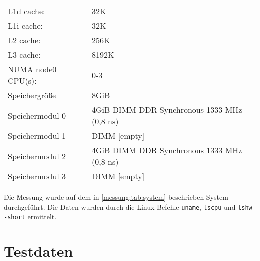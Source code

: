 \begin{table}
{\begin{tabular}{ll}
L1d cache:           & 32K \\
L1i cache:           & 32K \\
L2 cache:            & 256K \\
L3 cache:            & 8192K \\
NUMA node0 CPU(s):   & 0-3 \\
\midrule
Speichergröße        & 8GiB \\
Speichermodul 0      & 4GiB DIMM DDR Synchronous 1333 MHz (0,8 ns) \\
Speichermodul 1      & DIMM [empty] \\
Speichermodul 2      & 4GiB DIMM DDR Synchronous 1333 MHz (0,8 ns) \\
Speichermodul 3      & DIMM [empty] \\
\bottomrule
\end{tabular}
}
\end{table}

Die Messung wurde auf dem in \cref{messung:tab:system} beschrieben System durchgeführt. Die Daten wurden durch die Linux Befehle \texttt{uname}, \texttt{lscpu} und \texttt{lshw -short} ermittelt.

\section{Testdaten}

